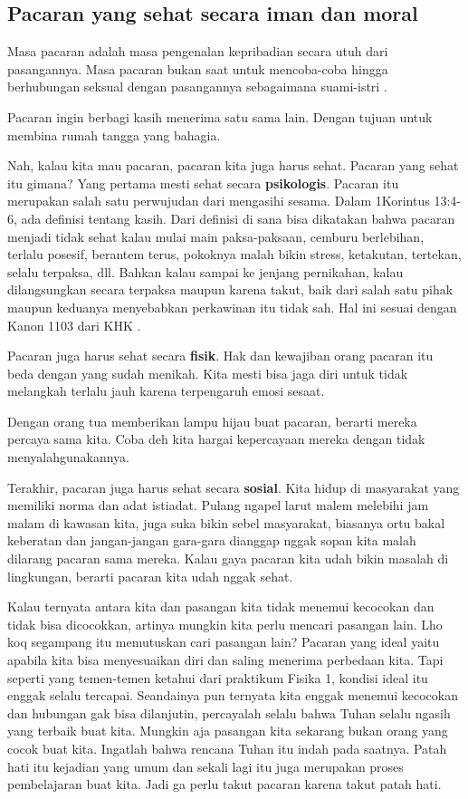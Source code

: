 \documentclass[11pt]{scrartcl}
\begin{document}
\subsection*{Pacaran yang sehat secara iman dan moral}
Masa pacaran adalah masa pengenalan kepribadian secara utuh dari pasangannya. Masa pacaran bukan saat untuk mencoba-coba hingga berhubungan seksual dengan pasangannya sebagaimana suami-istri \cite{kriswanta2009}.

Pacaran ingin berbagi kasih menerima satu sama lain. Dengan tujuan untuk membina rumah tangga yang bahagia. 

Nah, kalau kita mau pacaran, pacaran kita juga harus sehat. Pacaran yang sehat itu gimana? Yang pertama mesti sehat secara \textbf{psikologis}. Pacaran itu merupakan salah satu perwujudan dari mengasihi sesama. Dalam 1Korintus 13:4-6, ada definisi tentang kasih. Dari definisi di sana bisa dikatakan bahwa pacaran menjadi tidak sehat kalau mulai main paksa-paksaan, cemburu berlebihan, terlalu posesif, berantem terus, pokoknya malah bikin stress, ketakutan, tertekan, selalu terpaksa, dll. 
Bahkan kalau sampai ke jenjang pernikahan, kalau dilangsungkan secara terpaksa maupun karena takut, baik dari salah satu pihak maupun keduanya menyebabkan perkawinan itu tidak sah. Hal ini sesuai dengan Kanon 1103 dari KHK \cite{khk2011}.

Pacaran juga harus sehat secara \textbf{fisik}. Hak dan kewajiban orang pacaran itu beda dengan yang sudah menikah. Kita mesti bisa jaga diri untuk tidak melangkah terlalu jauh karena terpengaruh emosi sesaat. 

Dengan orang tua memberikan lampu hijau buat pacaran, berarti mereka percaya sama kita. Coba deh kita hargai kepercayaan mereka dengan tidak menyalahgunakannya.

Terakhir, pacaran juga harus sehat secara \textbf{sosial}. Kita hidup di masyarakat yang memiliki norma dan adat istiadat. Pulang ngapel larut malem melebihi jam malam di kawasan kita, juga suka bikin sebel masyarakat, biasanya ortu bakal keberatan dan jangan-jangan gara-gara dianggap nggak sopan kita malah dilarang pacaran sama mereka. Kalau gaya pacaran kita udah bikin masalah di lingkungan, berarti pacaran kita udah nggak sehat.

Kalau ternyata antara kita dan pasangan kita tidak menemui kecocokan dan tidak bisa dicocokkan, artinya mungkin kita perlu mencari pasangan lain. Lho koq segampang itu memutuskan cari pasangan lain? Pacaran yang ideal yaitu apabila kita bisa menyesuaikan diri dan saling menerima perbedaan kita. Tapi seperti yang temen-temen ketahui dari praktikum Fisika 1, kondisi ideal itu enggak selalu tercapai. Seandainya pun ternyata kita enggak menemui kecocokan dan hubungan gak bisa dilanjutin, percayalah selalu bahwa Tuhan selalu ngasih yang terbaik buat kita. Mungkin aja pasangan kita sekarang bukan orang yang cocok buat kita. Ingatlah bahwa rencana Tuhan itu indah pada saatnya. Patah hati itu kejadian yang umum dan sekali lagi itu juga merupakan proses pembelajaran buat kita. Jadi ga perlu takut pacaran karena takut patah hati.
\end{document}
